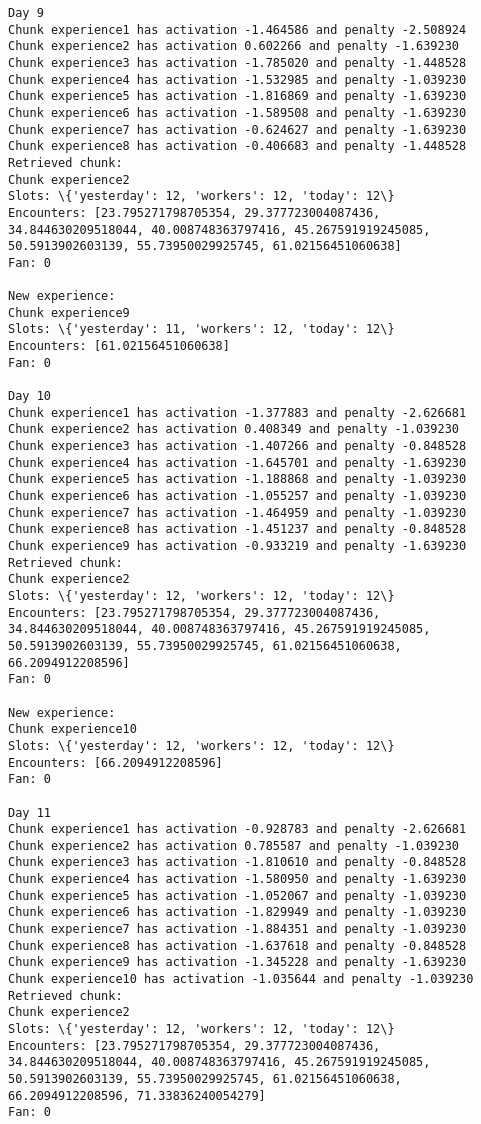 \documentclass[11pt]{article}
\begin{document}
\begin{Verbatim}[commandchars=\\\{\}]
Day 9
Chunk experience1 has activation -1.464586 and penalty -2.508924
Chunk experience2 has activation 0.602266 and penalty -1.639230
Chunk experience3 has activation -1.785020 and penalty -1.448528
Chunk experience4 has activation -1.532985 and penalty -1.039230
Chunk experience5 has activation -1.816869 and penalty -1.639230
Chunk experience6 has activation -1.589508 and penalty -1.639230
Chunk experience7 has activation -0.624627 and penalty -1.639230
Chunk experience8 has activation -0.406683 and penalty -1.448528
Retrieved chunk:
Chunk experience2
Slots: \{'yesterday': 12, 'workers': 12, 'today': 12\}
Encounters: [23.795271798705354, 29.377723004087436, 34.844630209518044, 40.008748363797416, 45.267591919245085, 50.5913902603139, 55.73950029925745, 61.02156451060638]
Fan: 0

New experience:
Chunk experience9
Slots: \{'yesterday': 11, 'workers': 12, 'today': 12\}
Encounters: [61.02156451060638]
Fan: 0

Day 10
Chunk experience1 has activation -1.377883 and penalty -2.626681
Chunk experience2 has activation 0.408349 and penalty -1.039230
Chunk experience3 has activation -1.407266 and penalty -0.848528
Chunk experience4 has activation -1.645701 and penalty -1.639230
Chunk experience5 has activation -1.188868 and penalty -1.039230
Chunk experience6 has activation -1.055257 and penalty -1.039230
Chunk experience7 has activation -1.464959 and penalty -1.039230
Chunk experience8 has activation -1.451237 and penalty -0.848528
Chunk experience9 has activation -0.933219 and penalty -1.639230
Retrieved chunk:
Chunk experience2
Slots: \{'yesterday': 12, 'workers': 12, 'today': 12\}
Encounters: [23.795271798705354, 29.377723004087436, 34.844630209518044, 40.008748363797416, 45.267591919245085, 50.5913902603139, 55.73950029925745, 61.02156451060638, 66.2094912208596]
Fan: 0

New experience:
Chunk experience10
Slots: \{'yesterday': 12, 'workers': 12, 'today': 12\}
Encounters: [66.2094912208596]
Fan: 0

Day 11
Chunk experience1 has activation -0.928783 and penalty -2.626681
Chunk experience2 has activation 0.785587 and penalty -1.039230
Chunk experience3 has activation -1.810610 and penalty -0.848528
Chunk experience4 has activation -1.580950 and penalty -1.639230
Chunk experience5 has activation -1.052067 and penalty -1.039230
Chunk experience6 has activation -1.829949 and penalty -1.039230
Chunk experience7 has activation -1.884351 and penalty -1.039230
Chunk experience8 has activation -1.637618 and penalty -0.848528
Chunk experience9 has activation -1.345228 and penalty -1.639230
Chunk experience10 has activation -1.035644 and penalty -1.039230
Retrieved chunk:
Chunk experience2
Slots: \{'yesterday': 12, 'workers': 12, 'today': 12\}
Encounters: [23.795271798705354, 29.377723004087436, 34.844630209518044, 40.008748363797416, 45.267591919245085, 50.5913902603139, 55.73950029925745, 61.02156451060638, 66.2094912208596, 71.33836240054279]
Fan: 0


\end{Verbatim}
\end{document}
